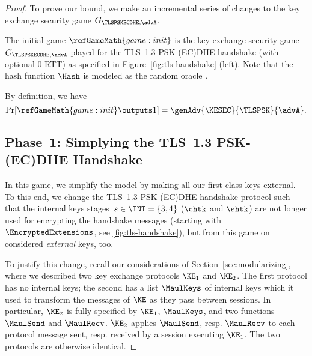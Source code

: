\begin{proof}
	To prove our bound, we make an incremental series of changes to the key exchange security game $G_{{\TLSPSKECDHE},\advA}$.
	
	
	The initial game $\refGameMath{game:init}$ is the key exchange security game $G_{{\TLSPSKECDHE},\advA}$ played for the TLS~1.3 PSK-(EC)DHE handshake (with optional 0-RTT) as specified in Figure~\ref{fig:tls-handshake} (left).
	Note that the hash function $\Hash$ is modeled as the random oracle \replace{$\RO_\hash$}{$\RO$}.
	
	By definition, we have
	\[
		\Pr [ \refGameMath{game:init} \outputs 1 ] = \genAdv{\KESEC}{\TLSPSK}{\advA}.
	\]
	
	\subsection*{Phase~1: Simplying the TLS~1.3 PSK-(EC)DHE Handshake}

	In this game, we simplify the model by making all our first-class keys external.
	To this end, we change the TLS~1.3 PSK-(EC)DHE handshake protocol such that the internal keys stages~$s \in \INT = \{3,4\}$ ($\chtk$ and $\shtk$)
	are not longer used for encrypting the handshake messages (starting with $\EncryptedExtensions$, see \autoref{fig:tls-handshake}), but from this game on considered \emph{external} keys, too.

	To justify this change, recall our considerations of Section~\ref{sec:modularizing}, where we described two key exchange protocols $\KE_1$ and $\KE_2$.
	The first protocol has no internal keys; the second has a list $\MaulKeys$ of internal keys which it used to transform the messages of $\KE$ as they pass between sessions.
	In particular, $\KE_2$ is fully specified by $\KE_1$, $\MaulKeys$, and two functions $\MaulSend$ and $\MaulRecv$.
	$\KE_2$ applies $\MaulSend$, resp. $\MaulRecv$ to each protocol message sent, resp. received by a session executing $\KE_1$.
	The two protocols are otherwise identical.
	

\end{proof}
